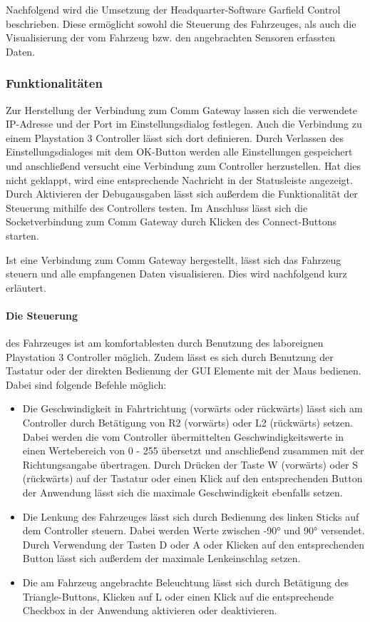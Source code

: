 Nachfolgend wird die Umsetzung der Headquarter-Software \glqq Garfield Control\grqq{} beschrieben. Diese ermöglicht sowohl die Steuerung des Fahrzeuges, als auch die Visualisierung der vom Fahrzeug bzw. den angebrachten Sensoren erfassten Daten.

\subsubsection{Funktionalitäten}

Zur Herstellung der Verbindung zum Comm Gateway lassen sich die verwendete IP-Adresse und der Port im Einstellungsdialog festlegen. Auch die Verbindung zu einem Playstation 3 Controller lässt sich dort definieren. Durch Verlassen des Einstellungsdialoges mit dem OK-Button werden alle Einstellungen gespeichert und anschließend versucht eine Verbindung zum Controller herzustellen. Hat dies nicht geklappt, wird eine entsprechende Nachricht in der Statusleiste angezeigt. Durch Aktivieren der Debugausgaben lässt sich außerdem die Funktionalität der Steuerung mithilfe des Controllers testen. Im Anschluss lässt sich die Socketverbindung zum Comm Gateway durch Klicken des Connect-Buttons starten.

Ist eine Verbindung zum Comm Gateway hergestellt, lässt sich das Fahrzeug steuern und alle empfangenen Daten visualisieren. Dies wird nachfolgend kurz erläutert.

\paragraph{Die Steuerung} des Fahrzeuges ist am komfortablesten durch Benutzung des laboreignen Playstation 3 Controller möglich. Zudem lässt es sich durch Benutzung der Tastatur oder der direkten Bedienung der GUI Elemente mit der Maus bedienen. Dabei sind folgende Befehle möglich:

\begin{itemize}
	\item Die Geschwindigkeit in Fahrtrichtung (vorwärts oder rückwärts) lässt sich am Controller durch Betätigung von R2 (vorwärts) oder L2 (rückwärts) setzen. Dabei werden die vom Controller übermittelten Geschwindigkeitswerte in einen Wertebereich von 0 - 255 übersetzt und anschließend zusammen mit der Richtungsangabe übertragen. Durch Drücken der Taste W (vorwärts) oder S (rückwärts) auf der Tastatur oder einen Klick auf den entsprechenden Button der Anwendung lässt sich die maximale Geschwindigkeit ebenfalls setzen.
	
	\item Die Lenkung des Fahrzeuges lässt sich durch Bedienung des linken Sticks auf dem Controller steuern. Dabei werden Werte zwischen -90° und 90° versendet. Durch Verwendung der Tasten D oder A oder Klicken auf den entsprechenden Button lässt sich außerdem der maximale Lenkeinschlag setzen.
	
	\item Die am Fahrzeug angebrachte Beleuchtung lässt sich durch Betätigung des Triangle-Buttons, Klicken auf L oder einen Klick auf die entsprechende Checkbox in der Anwendung aktivieren oder deaktivieren.
	
\end{itemize}

